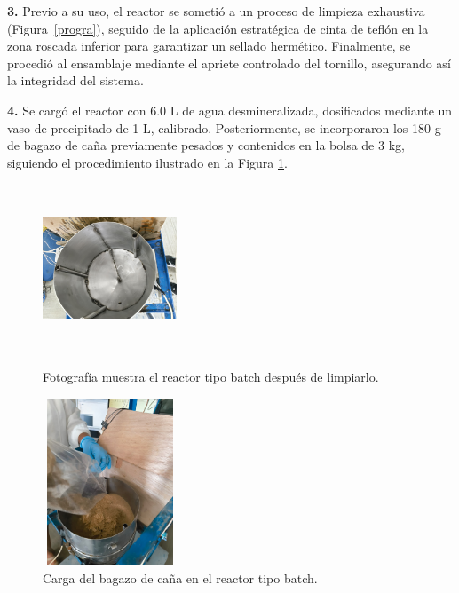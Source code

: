 \documentclass[12pt]{article}
\begin{document}
			\textbf{3.}	Previo a su uso, el reactor se sometió a un proceso de limpieza exhaustiva (Figura~\ref{progra}), seguido de la aplicación estratégica de cinta de teflón en la zona roscada inferior para garantizar un sellado hermético. Finalmente, se procedió al ensamblaje mediante el apriete controlado del tornillo, asegurando así la integridad del sistema.
			
			
			
			\textbf{4.}	Se cargó el reactor con 6.0 L de agua desmineralizada, dosificados mediante un vaso de precipitado de 1 L, calibrado. Posteriormente, se incorporaron los 180 g de bagazo de caña previamente pesados y contenidos en la bolsa de 3 kg, siguiendo el procedimiento ilustrado en la Figura \ref{baciad}.
			

				\begin{figure}[H]
				\centering
				\begin{minipage}{0.46\textwidth}
					\centering
					\includegraphics[width=4cm, height=5cm]{imagenes/reactor limpio} %
					\caption{Fotografía muestra el reactor tipo batch después de limpiarlo.}
					\label{progra}
				\end{minipage}
				\hfill
				\begin{minipage}{0.48\textwidth}
					\centering
					\includegraphics[width=4cm, height=5cm]{imagenes/biologico5} %
					\caption{ Carga del bagazo de caña en el reactor tipo batch.}
					\label{baciad}
				\end{minipage}
			\end{figure}
			
\end{document}
